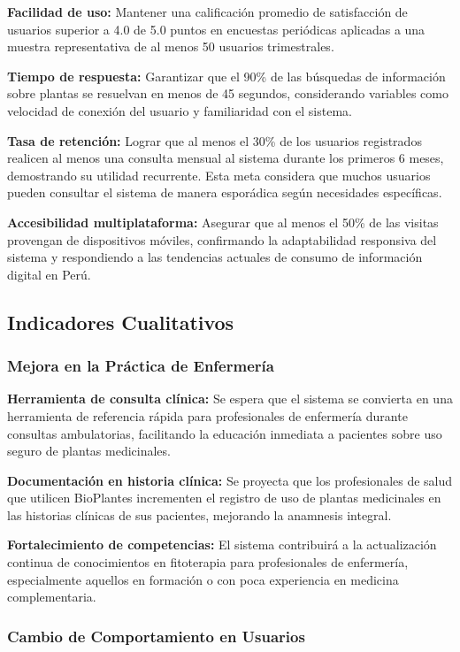 \documentclass[12pt,a4paper]{article}
\begin{document}
\textbf{Facilidad de uso:} Mantener una calificación promedio de satisfacción de usuarios superior a 4.0 de 5.0 puntos en encuestas periódicas aplicadas a una muestra representativa de al menos 50 usuarios trimestrales.

\textbf{Tiempo de respuesta:} Garantizar que el 90\% de las búsquedas de información sobre plantas se resuelvan en menos de 45 segundos, considerando variables como velocidad de conexión del usuario y familiaridad con el sistema.

\textbf{Tasa de retención:} Lograr que al menos el 30\% de los usuarios registrados realicen al menos una consulta mensual al sistema durante los primeros 6 meses, demostrando su utilidad recurrente. Esta meta considera que muchos usuarios pueden consultar el sistema de manera esporádica según necesidades específicas.

\textbf{Accesibilidad multiplataforma:} Asegurar que al menos el 50\% de las visitas provengan de dispositivos móviles, confirmando la adaptabilidad responsiva del sistema y respondiendo a las tendencias actuales de consumo de información digital en Perú.

\subsection{Indicadores Cualitativos}

\subsubsection{Mejora en la Práctica de Enfermería}

\textbf{Herramienta de consulta clínica:} Se espera que el sistema se convierta en una herramienta de referencia rápida para profesionales de enfermería durante consultas ambulatorias, facilitando la educación inmediata a pacientes sobre uso seguro de plantas medicinales.

\textbf{Documentación en historia clínica:} Se proyecta que los profesionales de salud que utilicen BioPlantes incrementen el registro de uso de plantas medicinales en las historias clínicas de sus pacientes, mejorando la anamnesis integral.

\textbf{Fortalecimiento de competencias:} El sistema contribuirá a la actualización continua de conocimientos en fitoterapia para profesionales de enfermería, especialmente aquellos en formación o con poca experiencia en medicina complementaria.

\subsubsection{Cambio de Comportamiento en Usuarios}
\end{document}
